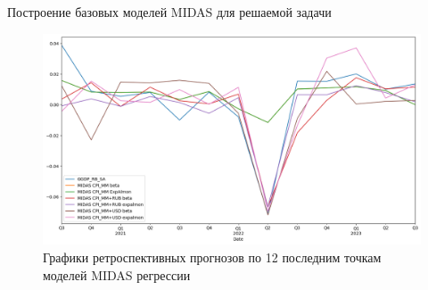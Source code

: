 \documentclass[notheorems, 10pt]{beamer}
\begin{document}
\begin{frame}
	{Построение базовых моделей MIDAS для решаемой задачи}
	\begin{figure}
		\centering
		\includegraphics[scale=0.35]{../TeX/images/img06}
		\caption{Графики ретроспективных прогнозов по 12 последним точкам моделей MIDAS регрессии}
		\label{fig:img06}
	\end{figure}
\end{frame}

\end{document}
